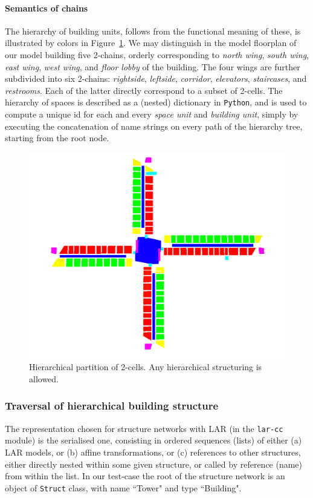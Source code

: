 \documentclass[]{egpubl}
\begin{document}
\paragraph*{Semantics of chains}

The hierarchy of building units, follows from the functional meaning of these, is illustrated by colors in Figure~\ref{fig:input-png6}. We may distinguish in the model floorplan of our model building five 2-chains, orderly corresponding to \emph{north wing}, \emph{south wing}, \emph{east wing}, \emph{west  wing}, and \emph{floor lobby} of the building. The four wings are further subdivided into six 2-chains: \emph{rightside}, \emph{leftside}, \emph{corridor}, \emph{elevators}, \emph{staircases}, and \emph{restrooms}. Each of the latter directly correspond to a subset of 2-cells. The hierarchy of spaces is described as a (nested) dictionary in \texttt{Python}, and is used to compute  a unique id for each and every \emph{space unit} and \emph{building unit}, simply by executing the concatenation of name strings on every path of the hierarchy tree, starting from the root node.

\begin{figure}[htbp] %
   \centering
   \includegraphics[width=0.7\linewidth]{images/input-colors} 
   \caption{Hierarchical partition of 2-cells. Any hierarchical structuring is allowed.}
   \label{fig:input-png6}
\end{figure}

\subsubsection*{Traversal of hierarchical building structure}

The representation chosen for structure networks with LAR (in the \texttt{lar-cc} module) is the serialised one, consisting in ordered sequences (lists) of either (a) LAR models, or (b) affine transformations, or (c) references to other structures, either directly nested within some given structure, or called by reference (name) from within the list.
In our test-case the root of the structure network is an object of \texttt{Struct} class, with name ``Tower" and type ``Building". 
\end{document}
